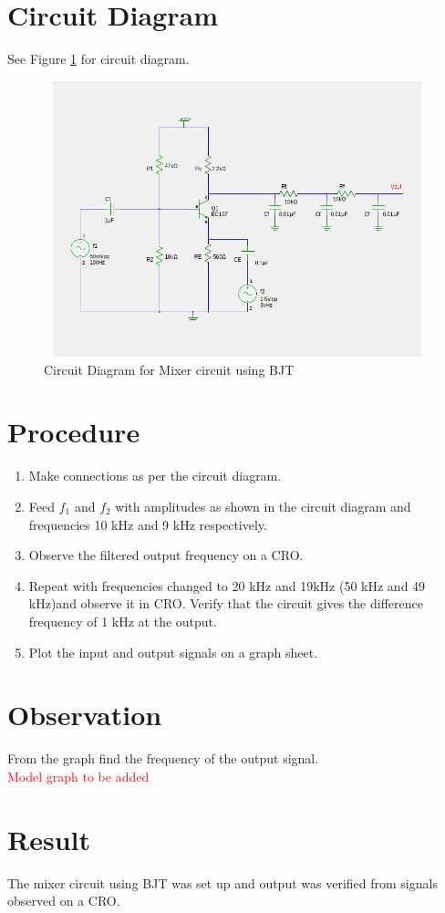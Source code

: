 \documentclass{book}
\begin{document}
\section*{Circuit Diagram}
See Figure \ref{mixer} for circuit diagram.
\begin{figure}[h]
\includegraphics[width=12cm, height=8cm, trim=1cm 1cm 1cm 2cm,clip=true]{mixer.png}
\caption{Circuit Diagram for Mixer circuit using BJT}
\label{mixer}
\end{figure}
\section*{Procedure}
\begin{enumerate}
\item
Make connections as per the circuit diagram.
\item
Feed $f_1$ and $f_2$ with amplitudes as shown in the circuit diagram and frequencies 10 kHz and 9 kHz respectively.
\item
Observe the filtered output frequency on a CRO.
\item
Repeat with frequencies changed to 20 kHz and 19kHz  (50 kHz and 49 kHz)and observe it in CRO. Verify that the circuit gives the difference frequency of 1 kHz at the output.
\item
Plot the input and output signals on a graph sheet. 

\end{enumerate}
\section*{Observation}
From the graph find the frequency of the output signal.\\
\textcolor{red}{Model graph to be added}
\section*{Result}
The mixer circuit using BJT was set up and output was verified from signals observed on a CRO.
\end{document}
